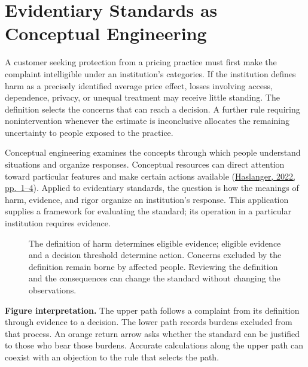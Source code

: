 
\hypertarget{M09-evidentiary-standards-as-conceptual-engineering}{%
\section{Evidentiary Standards as Conceptual
Engineering}\label{M09-evidentiary-standards-as-conceptual-engineering}}

\noindent A customer seeking protection from a pricing practice must first make
the complaint intelligible under an institution's categories. If the
institution defines harm as a precisely identified average price effect,
losses involving access, dependence, privacy, or unequal treatment may
receive little standing. The definition selects the concerns that can
reach a decision. A further rule requiring nonintervention whenever the
estimate is inconclusive allocates the remaining uncertainty to people
exposed to the practice.

Conceptual engineering examines the concepts through which people
understand situations and organize responses. Conceptual resources can
direct attention toward particular features and make certain actions
available
(\href{https://sallyhaslanger.weebly.com/uploads/1/8/2/7/18272031/haslanger_san_raffaele_4_hdo.pdf}{Haslanger,
2022, pp.~1--4}). Applied to evidentiary standards, the question is how
the meanings of harm, evidence, and rigor organize an institution's
response. This application supplies a framework for evaluating the
standard; its operation in a particular institution requires evidence.

\begin{figure}[htbp]
\centering

\caption{The definition of harm determines eligible evidence; eligible evidence and a decision threshold determine action. Concerns excluded by the definition remain borne by affected people. Reviewing the definition and the consequences can change the standard without changing the observations.}\label{fig:M09_evidence_standards}
\end{figure}

\textbf{Figure interpretation.} The upper path follows a complaint from
its definition through evidence to a decision. The lower path records
burdens excluded from that process. An orange return arrow asks whether
the standard can be justified to those who bear those burdens. Accurate
calculations along the upper path can coexist with an objection to the
rule that selects the path.

